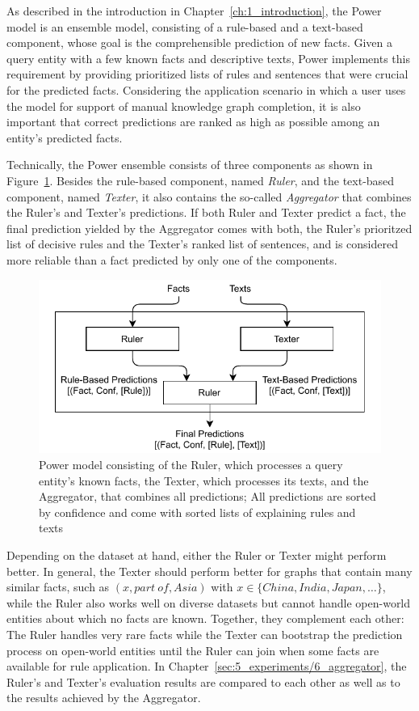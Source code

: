 As described in the introduction in Chapter~\ref{ch:1_introduction}, the Power model is an ensemble model, consisting of a rule-based and a text-based component, whose goal is the comprehensible prediction of new facts. Given a query entity with a few known facts and descriptive texts, Power implements this requirement by providing prioritized lists of rules and sentences that were crucial for the predicted facts. Considering the application scenario in which a user uses the model for support of manual knowledge graph completion, it is also important that correct predictions are ranked as high as possible among an entity's predicted facts.

Technically, the Power ensemble consists of three components as shown in Figure~\ref{fig:4_approach/power_architecture}. Besides the rule-based component, named \emph{Ruler}, and the text-based component, named \emph{Texter}, it also contains the so-called \emph{Aggregator} that combines the Ruler's and Texter's predictions. If both Ruler and Texter predict a fact, the final prediction yielded by the Aggregator comes with both, the Ruler's prioritzed list of decisive rules and the Texter's ranked list of sentences, and is considered more reliable than a fact predicted by only one of the components.

\begin{figure}[t]
    \centering
    \includegraphics[width=\textwidth]{4_approach/power_architecture}
    \caption{Power model consisting of the Ruler, which processes a query entity's known facts, the Texter, which processes its texts, and the Aggregator, that combines all predictions; All predictions are sorted by confidence and come with sorted lists of explaining rules and texts}
    \label{fig:4_approach/power_architecture}
\end{figure}

Depending on the dataset at hand, either the Ruler or Texter might perform better. In general, the Texter should perform better for graphs that contain many similar facts, such as $(x, part~of, Asia)$ with $x \in \{China, India, Japan, \dots\}$, while the Ruler also works well on diverse datasets but cannot handle open-world entities about which no facts are known. Together, they complement each other: The Ruler handles very rare facts while the Texter can bootstrap the prediction process on open-world entities until the Ruler can join when some facts are available for rule application. In Chapter~\ref{sec:5_experiments/6_aggregator}, the Ruler's and Texter's evaluation results are compared to each other as well as to the results achieved by the Aggregator.

